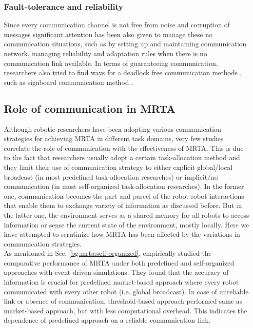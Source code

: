 \subsubsection*{Fault-tolerance and reliability}
Since every communication channel is not free from noise and corruption of messages significant attention has been also given to manage these no communication situations, such as by setting up and maintaining communication network, managing reliability and adaptation rules when there is no communication link available. In terms of guaranteeing communication, researchers also tried to find ways for a deadlock free communication methods \cite{Arkin1998}, such as signboard communication method \cite{Wang1989}.
\subsection{Role of communication in MRTA}
Although robotic researchers have been adopting various communication strategies for achieving MRTA in different task domains, very few studies correlate the role of communication with the effectiveness of MRTA. This is due to the fact that researchers usually adopt a certain task-allocation method and they limit their use of communication strategy to either explicit global/local broadcast (in most predefined task-allocation researches) or  implicit/no communication (in most self-organized task-allocation researches). In the former one, communication becomes the part and parcel of the robot-robot interactions that enable them to exchange variety of information as discussed before. But in the latter one, the environment serves as a shared memory for all robots to access information or sense the current state of the environment, mostly locally. Here we have attempted to scrutinize how MRTA has been affected by the variations in communication strategies.\\
As mentioned in Sec. \ref{bg:mrta:self-organized},  empirically studied the comparative performance of MRTA under both predefined and self-organized approaches with event-driven simulations. They found that the accuracy of information is crucial for predefined market-based approach where every robot communicated with every other robot (i.e. global broadcast). In case of unreliable link or absence of communication, threshold-based approach performed same as market-based approach, but with less computational overhead. This indicates the dependence of predefined approach on a reliable communication link.
